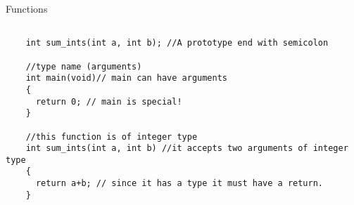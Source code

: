 \documentclass[10pt]{beamer}
\begin{document}
\begin{frame}[fragile]{Functions}

    \begin{lstlisting}

    int sum_ints(int a, int b); //A prototype end with semicolon

    //type name (arguments)
    int main(void)// main can have arguments
    {
      return 0; // main is special!
    }
   
    //this function is of integer type
    int sum_ints(int a, int b) //it accepts two arguments of integer type
    {
      return a+b; // since it has a type it must have a return.
    }
    \end{lstlisting}
    \vspace{0.2cm}
 
\end{frame}
\end{document}
